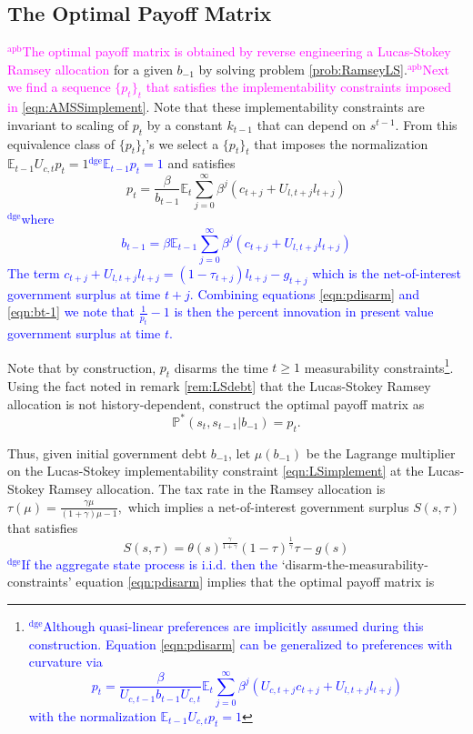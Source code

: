 \documentclass[12pt]{article}
\newcommand{\dge}[1]{\textcolor{blue}{$^{\textrm{dge}}${#1}}}
\newcommand{\apb}[1]{\textcolor{magenta}{$^{\textrm{apb}}${#1}}}
\newcommand{\EE}{\mathbb E}
\begin{document}
\subsection{The Optimal Payoff Matrix}\apb{The optimal payoff matrix is obtained by reverse engineering a Lucas-Stokey Ramsey allocation} for a given $b_{-1}$ by solving  problem \ref{prob:RamseyLS}.\apb{Next we find a sequence $\{p_t\}_t$ that satisfies the implementability constraints imposed in \eqref{eqn:AMSSimplement}}.  Note that these implementability constraints are invariant to scaling of $p_t$ by a constant $k_{t-1} $ that can depend on $s^{t-1}$. From this equivalence class of $\{p_t\}_t$'s we select a  $\{p_t\}_t$ that imposes the normalization  \st{$\mathbb{E}_{t-1}U_{c,t}p_t=1$}\dge{$\mathbb{E}_{t-1}p_t=1$} and satisfies
\begin{equation}\label{eqn:pdisarm} 
p_t =  \frac{\beta}{b_{t-1}}\EE_t\sum_{j=0}^\infty\beta^j\left( c_{t+j}+U_{l,t+j}l_{t+j}\right) 
\end{equation}\dge{where 
\begin{equation}\label{eqn:bt-1}
	b_{t-1} = \beta \EE_{t-1}\sum_{j=0}^\infty \beta^j(c_{t+j}+U_{l,t+j}l_{t+j})
\end{equation}  The term $c_{t+j} +U_{l,t+j}l_{t+j}=(1-\tau_{t+j})l_{t+j} - g_{t+j}$ which is the net-of-interest government surplus at time $t+j$.  Combining equations \eqref{eqn:pdisarm} and \eqref{eqn:bt-1} we note that  $\frac{1}{p_t}-1$ is then the percent innovation in present value government surplus at time $t$.} 


Note that by construction, $p_t$   disarms the time  $t\geq 1$
measurability constraints\footnote{\dge{Although quasi-linear preferences are implicitly assumed during this construction.  Equation \eqref{eqn:pdisarm} can be generalized to preferences with curvature via
\[
p_t =  \frac{\beta}{U_{c,t-1}b_{t-1}U_{c,t}}\EE_t\sum_{j=0}^\infty\beta^j\left( U_{c,t+j}c_{t+j}+U_{l,t+j}l_{t+j}\right) \]
with the normalization $\EE_{t-1}U_{c,t}p_t = 1$}}.  Using the fact noted in remark \ref{rem:LSdebt} that the Lucas-Stokey Ramsey allocation is not history-dependent,  construct the optimal payoff matrix as
\[\mathbb{P}^*(s_t,s_{t-1}|b_{-1})=p_t.\]

Thus,  given
 initial government debt $b_{-1}$,  let $\mu(b_{-1})$ be the Lagrange multiplier on the Lucas-Stokey implementability constraint \eqref{eqn:LSimplement}
 at the Lucas-Stokey Ramsey allocation.   The tax rate in the Ramsey allocation is
$
		\tau(\mu) = \frac{\gamma\mu}{(1+\gamma)\mu-1},
	$
 which implies a  net-of-interest government surplus $S(s,\tau)$ that satisfies
\[		S(s,\tau) = \theta(s)^\frac\gamma{1+\gamma}(1-\tau)^\frac1\gamma\tau-g(s)
	\]
\dge{If the aggregate state process is i.i.d. then the} `disarm-the-measurability-constraints' equation \eqref{eqn:pdisarm} implies that the optimal payoff matrix is
\end{document}
